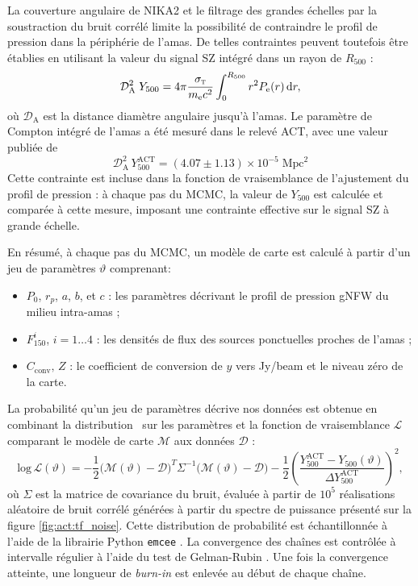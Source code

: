 La couverture angulaire de NIKA2 et le filtrage des grandes échelles par la soustraction du bruit corrélé limite la possibilité de contraindre le profil de pression dans la périphérie de l'amas.
De telles contraintes peuvent toutefois être établies en utilisant la valeur du signal SZ intégré dans un rayon de $R_{500}$ :
\begin{equation}
    \mathcal{D}_\mathrm{A}^2 \; Y_{500} = 4\pi \frac{\sigma_\textsc{t}}{m_{\rm e} c^2}\int_0^{R_{500}} r^2 P_{\rm e}(r) \, \mathrm{d} r,
\end{equation}
où $\mathcal{D}_\mathrm{A}$ est la distance diamètre angulaire jusqu'à l'amas.
Le paramètre de Compton intégré de l'amas a été mesuré dans le relevé ACT, avec une valeur publiée de \cite{hasselfield_atacama_2013}
\begin{equation}
    \mathcal{D}_\mathrm{A}^2 \, Y_{500}^\mathrm{ACT} = (4.07 \pm 1.13) \times 10^{-5} \;\mathrm{Mpc}^2
\end{equation}
Cette contrainte est incluse dans la fonction de vraisemblance de l'ajustement du profil de pression : à chaque pas du MCMC, la valeur de $Y_{500}$ est calculée et comparée à cette mesure, imposant une contrainte effective sur le signal SZ à grande échelle.

En résumé, à chaque pas du MCMC, un modèle de carte est calculé à partir d'un jeu de paramètres $\vartheta$ comprenant:
\begin{itemize}
    \setlength\itemsep{0pt}
    \item $P_0$, $r_p$, $a$, $b$, et $c$ : les paramètres décrivant le profil de pression gNFW du milieu intra-amas ;
    \item $F_{150}^i$, $i = 1 \dots 4$ : les densités de flux des sources ponctuelles proches de l'amas ;
    \item $C_\mathrm{conv},\,Z$ : le coefficient de conversion de $y$ vers Jy/beam et le niveau zéro de la carte.
\end{itemize}
La probabilité qu'un jeu de paramètres décrive nos données est obtenue en combinant la distribution \prior\ sur les paramètres et la fonction de vraisemblance $\mathcal{L}$ comparant le modèle de carte $\mathcal{M}$ aux données $\mathcal{D}$ :
\begin{equation}
    \mathrm{log}\,\mathcal{L}(\vartheta) =
        -\frac{1}{2}
        \big(\mathcal{M}(\vartheta) - \mathcal{D} \big)^T
        \Sigma^{-1}
        \big(\mathcal{M}(\vartheta) - \mathcal{D} \big)
        - \frac{1}{2}
        \left(\frac{Y_{500}^\mathrm{ACT} - Y_{500}(\vartheta)}{\Delta Y_{500}^\mathrm{ACT}}\right)^2,
    \label{eq:likelihood}
\end{equation}
où $\Sigma$ est la matrice de covariance du bruit, évaluée à partir de $10^5$ réalisations aléatoire de bruit corrélé générées à partir du spectre de puissance présenté sur la figure \ref{fig:act:tf_noise}.
Cette distribution de probabilité est échantillonnée à l'aide de la librairie Python \texttt{emcee} \cite{foreman-mackey_emcee_2019}.
La convergence des chaînes est contrôlée à intervalle régulier à l'aide du test de Gelman-Rubin \cite{gelman_inference_1992}.
Une fois la convergence atteinte, une longueur de \textit{burn-in} est enlevée au début de chaque chaîne.

